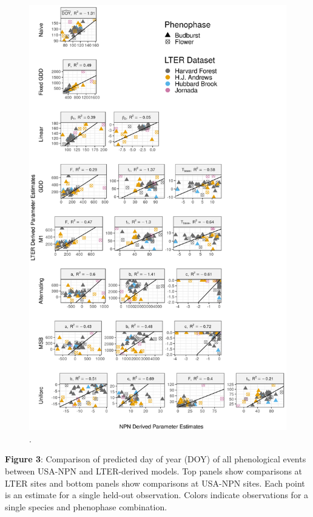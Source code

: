 \documentclass[fleqn,12pt,lineno]{article}
\begin{document}
\begin{figure}[H]
	\centering
		\includegraphics[scale=0.65]{figure_param_comparison.png}
    \caption{.}
\end{figure}


\newpage

\textbf{Figure 3}: Comparison of predicted day of year (DOY) of all phenological events between USA-NPN and LTER-derived models. Top panels show comparisons at LTER sites and bottom panels show comparisons at USA-NPN sites. Each point is an estimate for a single held-out observation. Colors indicate observations for a single species and phenophase combination.
\end{document}
